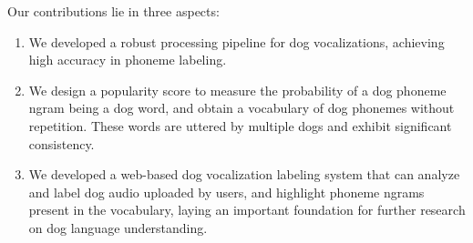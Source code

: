 Our contributions lie in three aspects: 
\begin{enumerate}
\item We developed a robust processing pipeline for dog vocalizations, achieving high accuracy in phoneme labeling.
\item We design a popularity score to measure the probability of a dog phoneme ngram being a dog word, and obtain a vocabulary of dog phonemes without repetition. These words are uttered by multiple dogs and exhibit significant consistency.
\item We developed a web-based dog vocalization labeling system that can analyze and label dog audio uploaded by users, and highlight phoneme ngrams present in the vocabulary, laying an important foundation for further research on dog language understanding.
\end{enumerate}
